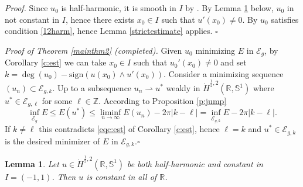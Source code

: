 \documentclass[12pt, a4paper]{article}
\newtheorem{lem}[thm]{Lemma}
\newenvironment{proof}{\noindent\emph{Proof.}}{\hfill$\square$\medskip}
\newcommand{\M}[1]{\mathcal{#1}}
\newcommand{\sph}{\mathbb{S}}
\newcommand{\R}{\mathbb{R}}
\renewcommand{\(}{\left(}
\renewcommand{\)}{\right)}
\begin{document}
\begin{proof} Since $u_0$ is half-harmonic, it is smooth in $I$ by \cite{DLR}. By Lemma \ref{l:unicont} below, $u_0$ in not constant in $I$, hence there exists $x_0\in I$ such that $u'(x_0)\ne 0$. By \cite[Sec. 1]{milsir} $u_0$ satisfies condition \eqref{12harm}, hence Lemma \ref{strictestimate} applies.
\end{proof}

\noindent\emph{Proof of Theorem \ref{mainthm2} (completed).} Given $u_0$ minimizing $E$ in $\M{E}_g$, by Corollary \eqref{c:est} we can take $x_0\in I$ such that $u_0'(x_0)\ne 0$ and set $k=\deg(u_0)-\mathrm{sign}(u(x_0)\wedge u'(x_0))$. Consider a minimizing sequence $(u_n)\subset \M{E}_{g,k}$. Up to a subsequence $u_n\rightharpoonup  u^*$ weakly in $\dot H^{\frac12,2}(\R,\sph^1)$ where $ u^* \in  \M{E}_{g,\ell}$ for some $\ell\in\mathbb{Z}$. According to Proposition \ref{p:jump}
$$\inf_{\M{E}_g}E\le E(u^*)\le \liminf_{n\to\infty} E(u_n)-2\pi |k-\ell|= \inf_{\M{E}_{g,k}}E -2\pi |k-\ell|.$$
If $k\ne\ell$ this contradicts \eqref{eqc:est} of Corollary \ref{c:est}, hence $\ell=k$ and $ u^*\in \M{E}_{g,k}$ is the desired minimizer of $E$ in $\M{E}_{g,k}$.\hfill$\square$





\begin{lem}\label{l:unicont} Let $u\in \dot H^{\frac12,2}(\R,\sph^1)$ be both half-harmonic and constant in $I=(-1,1)$. Then $u$ is constant in all of  $\R$.
\end{lem}
\end{document}
